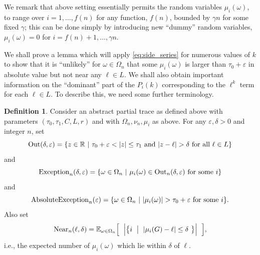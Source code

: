 \documentclass{memo-l}
\theoremstyle{plain}
\theoremstyle{definition}
\numberwithin{section}{chapter}
\numberwithin{equation}{chapter}
\newcommand{\expect}[2]{{\mathbb{E}}_{#1}{\left[\; #2\; \right]}}
\theoremstyle{plain}
\theoremstyle{definition}
\newtheorem{defn}[theorem]{Definition}
\newcommand\RR{\mathbb{R}}
\begin{document}
We remark that above setting essentially permits the random variables \(
\mu_i(\omega) \), to range over \( i=1,\ldots,f(n) \) for any function, \(
f(n) \), bounded by \( \gamma n \) for some fixed \( \gamma \); this can be
done simply by introducing new ``dummy'' random variables, \(
\mu_i(\omega)=0 \) for \( i=f(n)+1,\ldots,\gamma n \).


We shall prove a lemma which will apply \eqref{eq:side_series} for numerous
values of \( k \) to show that it is ``unlikely'' for \( \omega\in\Omega_n
\) that some \( \mu_i(\omega) \) is larger than \( \tau_0+\varepsilon \) in
absolute value but not near any \( \ell\in L \).  We shall also obtain
important information on the ``dominant'' part of the \( P_i(k) \)
corresponding to the \( \ell^k \) term for each \( \ell\in L \).  To
describe this, we need some further terminology.

\begin{defn} 
\label{de:partial_trace_sets}
Consider an abstract partial trace as defined above with
parameters \( (\tau_0,\tau_1,C,L,r) \) and with \( \Omega_n,\nu_n,\mu_i \) as
above.  For any \( \varepsilon,\delta>0 \) and integer \( n \), set \[ {\rm
Out}(\delta,\varepsilon) =  \{ z\in\RR\ |\ \mbox{\(
\tau_0+\varepsilon<|z|\leq \tau_1 \) and \( |z-\ell| > \delta \) for all \(
\ell\in L \)} \} \] and \[ {\rm Exception}_n(\delta,\varepsilon) = \{
\omega\in \Omega_n\ | \ \mbox{\( \mu_i(\omega)\in {\rm
Out}_n(\delta,\varepsilon) \) for some \( i \)} \}  \] and \[ {\rm
AbsoluteException}_n(\varepsilon) = \{ \omega\in \Omega_n\ | \ \mbox{\(
|\mu_i(\omega)|>\tau_0+\varepsilon \) for some \( i \)} \}   .  \] Also set
\[ {\rm Near}_n(\ell,\delta) = \expect{\omega\in\Omega_n}{\ \Bigl|\bigl\{ i
\ \bigm|\  |\mu_i(G)-\ell|\leq \delta \ \bigr\}\Bigr|\ } , \] i.e., the
expected number of \( \mu_i(\omega) \) which lie within \( \delta \) of \(
\ell \).  \end{defn}
\end{document}
